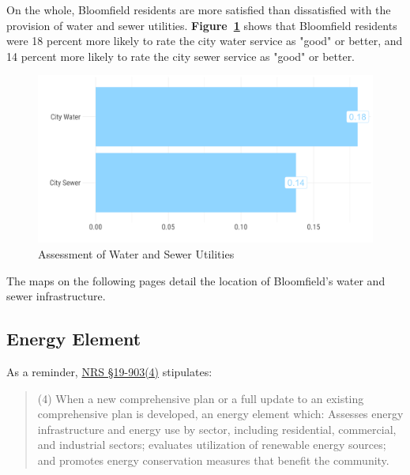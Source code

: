 \pagebreak
\noindent On the whole, Bloomfield residents are more satisfied than dissatisfied with the provision of water and sewer utilities. \textbf{Figure~\ref{fig:scoreWaterSewer}} shows that Bloomfield residents were 18 percent more likely to rate the city water service as "good" or better, and 14 percent more likely to rate the city sewer service as "good" or better.

\begin{figure}[H]
\centering
\begin{framed}
    \caption{Assessment of Water and Sewer Utilities}
    \label{fig:scoreWaterSewer}
    \includegraphics[width = \linewidth]{figures/score_water_sewer.png}
\end{framed}
\end{figure}

\noindent The maps on the following pages detail the location of Bloomfield's water and sewer infrastructure.

\pagebreak
\thispagestyle{empty}
\begin{landscape}
    
\end{landscape}

\pagebreak
\thispagestyle{empty}
\begin{landscape}
    
\end{landscape}

\pagebreak
\subsection{Energy Element}

\noindent As a reminder, \href{https://nebraskalegislature.gov/laws/statutes.php?statute=19-903}{NRS \S 19-903(4)} stipulates:

\begin{quote}
    (4) When a new comprehensive plan or a full update to an existing comprehensive plan is developed, an energy element which: Assesses energy infrastructure and energy use by sector, including residential, commercial, and industrial sectors; evaluates utilization of renewable energy sources; and promotes energy conservation measures that benefit the community.
\end{quote}

